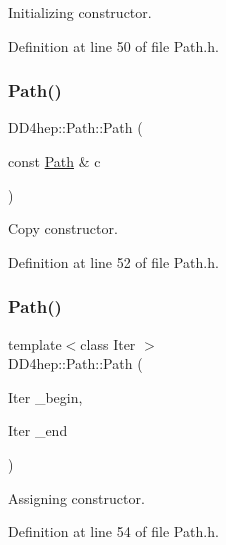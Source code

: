 Initializing constructor. 



Definition at line 50 of file Path.\+h.

\hypertarget{class_d_d4hep_1_1_path_aacc0beb72c34b440b89ef40eeec0fe97}{}\label{class_d_d4hep_1_1_path_aacc0beb72c34b440b89ef40eeec0fe97} 
\subsubsection{\texorpdfstring{Path()}{Path()}\hspace{0.1cm}{\footnotesize\ttfamily [3/4]}}
{\footnotesize\ttfamily D\+D4hep\+::\+Path\+::\+Path (\begin{DoxyParamCaption}\item[{const \hyperlink{class_d_d4hep_1_1_path}{Path} \&}]{c }\end{DoxyParamCaption})\hspace{0.3cm}{\ttfamily [inline]}}



Copy constructor. 



Definition at line 52 of file Path.\+h.

\hypertarget{class_d_d4hep_1_1_path_ad172701df31032c89397b47832fc5a31}{}\label{class_d_d4hep_1_1_path_ad172701df31032c89397b47832fc5a31} 
\subsubsection{\texorpdfstring{Path()}{Path()}\hspace{0.1cm}{\footnotesize\ttfamily [4/4]}}
{\footnotesize\ttfamily template$<$class Iter $>$ \\
D\+D4hep\+::\+Path\+::\+Path (\begin{DoxyParamCaption}\item[{Iter}]{\+\_\+begin,  }\item[{Iter}]{\+\_\+end }\end{DoxyParamCaption})\hspace{0.3cm}{\ttfamily [inline]}}



Assigning constructor. 



Definition at line 54 of file Path.\+h.



